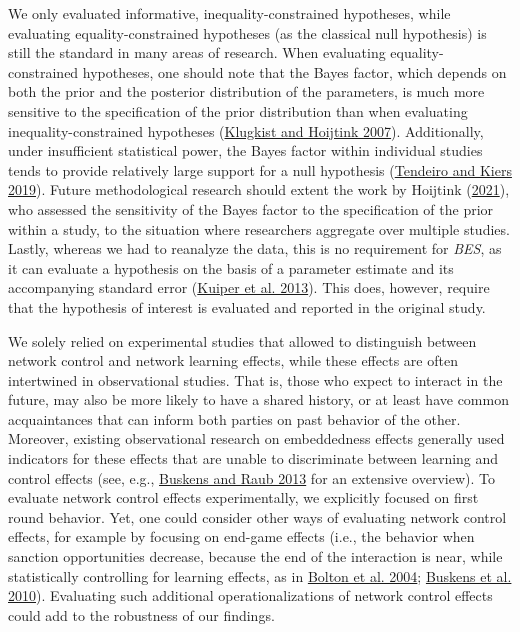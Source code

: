 \documentclass[
  11pt,
]{article}
\begin{document}
We only evaluated informative, inequality-constrained hypotheses, while evaluating equality-constrained hypotheses (as the classical null hypothesis) is still the standard in many areas of research.
When evaluating equality-constrained hypotheses, one should note that the Bayes factor, which depends on both the prior and the posterior distribution of the parameters, is much more sensitive to the specification of the prior distribution than when evaluating inequality-constrained hypotheses (\protect\hyperlink{ref-klugkist_bf_2007}{Klugkist and Hoijtink 2007}).
Additionally, under insufficient statistical power, the Bayes factor within individual studies tends to provide relatively large support for a null hypothesis (\protect\hyperlink{ref-tendeiro_kiers_2019}{Tendeiro and Kiers 2019}).
Future methodological research should extent the work by Hoijtink (\protect\hyperlink{ref-hoijtink_prior_2021}{2021}), who assessed the sensitivity of the Bayes factor to the specification of the prior within a study, to the situation where researchers aggregate over multiple studies.
Lastly, whereas we had to reanalyze the data, this is no requirement for \emph{BES}, as it can evaluate a hypothesis on the basis of a parameter estimate and its accompanying standard error (\protect\hyperlink{ref-kuiper_combining_2013}{Kuiper et al. 2013}).
This does, however, require that the hypothesis of interest is evaluated and reported in the original study.

We solely relied on experimental studies that allowed to distinguish between network control and network learning effects, while these effects are often intertwined in observational studies.
That is, those who expect to interact in the future, may also be more likely to have a shared history, or at least have common acquaintances that can inform both parties on past behavior of the other.
Moreover, existing observational research on embeddedness effects generally used indicators for these effects that are unable to discriminate between learning and control effects (see, e.g., \protect\hyperlink{ref-buskens_raub_handbook_2013}{Buskens and Raub 2013} for an extensive overview).
To evaluate network control effects experimentally, we explicitly focused on first round behavior.
Yet, one could consider other ways of evaluating network control effects, for example by focusing on end-game effects (i.e., the behavior when sanction opportunities decrease, because the end of the interaction is near, while statistically controlling for learning effects, as in \protect\hyperlink{ref-bolton_electronic_2004}{Bolton et al. 2004}; \protect\hyperlink{ref-buskens_raub_veer_triads_2010}{Buskens et al. 2010}).
Evaluating such additional operationalizations of network control effects could add to the robustness of our findings.
\end{document}
